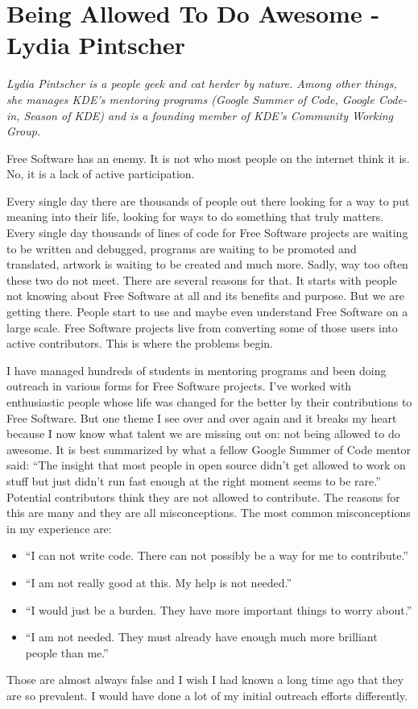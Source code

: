 \chapter{Being Allowed To Do Awesome - Lydia Pintscher}

\textit{Lydia Pintscher is a people geek and cat herder by nature. Among other things, she manages KDE's mentoring programs (Google Summer of Code, Google Code-in, Season of KDE) and is a founding member of KDE's Community Working Group.}

Free Software has an enemy. It is not who most people on the internet think it is. No, it is a lack of active participation.

Every single day there are thousands of people out there looking for a way to put meaning into their life, looking for ways to do something that truly matters. Every single day thousands of lines of code for Free Software projects are waiting to be written and debugged, programs are waiting to be promoted and translated, artwork is waiting to be created and much more. Sadly, way too often these two do not meet. There are several reasons for that. It starts with people not knowing about Free Software at all and its benefits and purpose. But we are getting there. People start to use and maybe even understand Free Software on a large scale. Free Software projects live from converting some of those users into active contributors. This is where the problems begin.

I have managed hundreds of students in mentoring programs and been doing outreach in various forms for Free Software projects. I've worked with enthusiastic people whose life was changed for the better by their contributions to Free Software. But one theme I see over and over again and it breaks my heart because I now know what talent we are missing out on: not being allowed to do awesome. It is best summarized by what a fellow Google Summer of Code mentor said: ``The insight that most people in open source didn’t get allowed to work on stuff but just didn’t run fast enough at the right moment seems to be rare.'' Potential contributors think they are not allowed to contribute. The reasons for this are many and they are all misconceptions. The most common misconceptions in my experience are:
\begin{itemize}
 \item ``I can not write code. There can not possibly be a way for me to contribute.''
 \item ``I am not really good at this. My help is not needed.''
 \item ``I would just be a burden. They have more important things to worry about.''
 \item ``I am not needed. They must already have enough much more brilliant people than me.''
\end{itemize}
Those are almost always false and I wish I had known a long time ago that they are so prevalent. I would have done a lot of my initial outreach efforts differently.

